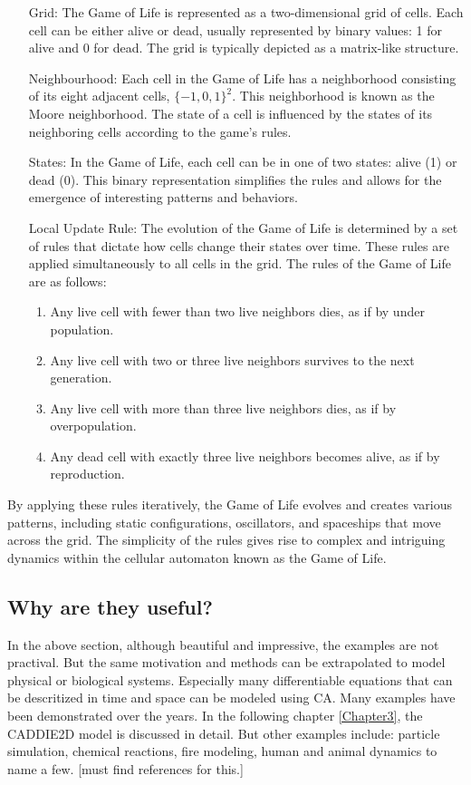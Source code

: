 \begin{enumerate}[align=left]
	\item[Grid:] The Game of Life is represented as a two-dimensional grid of cells. Each cell can be either alive or dead, usually represented by binary values: 1 for alive and 0 for dead. The grid is typically depicted as a matrix-like structure.
	\item[Neighbourhood:] Each cell in the Game of Life has a neighborhood consisting of its eight adjacent cells, $\{-1, 0, 1\}^{2}$. This neighborhood is known as the Moore neighborhood. The state of a cell is influenced by the states of its neighboring cells according to the game's rules.
	\item[States:] In the Game of Life, each cell can be in one of two states: alive (1) or dead (0). This binary representation simplifies the rules and allows for the emergence of interesting patterns and behaviors.
	\item[Local Update Rule:] The evolution of the Game of Life is determined by a set of rules that dictate how cells change their states over time. These rules are applied simultaneously to all cells in the grid. The rules of the Game of Life are as follows:
	\begin{enumerate}
		\item Any live cell with fewer than two live neighbors dies, as if by under population.
		\item Any live cell with two or three live neighbors survives to the next generation.
		\item Any live cell with more than three live neighbors dies, as if by overpopulation.
		\item Any dead cell with exactly three live neighbors becomes alive, as if by reproduction.
	\end{enumerate}
\end{enumerate}

By applying these rules iteratively, the Game of Life evolves and creates various patterns, including static configurations, oscillators, and spaceships that move across the grid. The simplicity of the rules gives rise to complex and intriguing dynamics within the cellular automaton known as the Game of Life.



\subsection{Why are they useful?}
In the above section, although beautiful and impressive, the examples are not practival. But the same motivation and methods can be extrapolated to model physical or biological systems. Especially many differentiable equations that can be descritized in time and space can be modeled using CA. Many examples have been demonstrated over the years. In the following chapter \ref{Chapter3}, the CADDIE2D model is discussed in detail. But other examples include: particle simulation, chemical reactions, fire modeling, human and animal dynamics to name a few. [must find references for this.]

